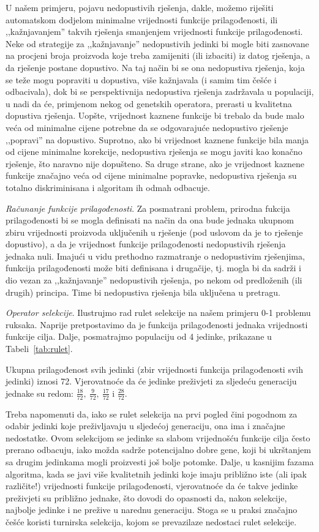 \documentclass[b5paper, utf8, 11pt, colorlinks]{book}
\theoremstyle{definition}
\begin{document}
U našem primjeru, pojavu nedopustivih rješenja, dakle, možemo riješiti automatskom dodjelom minimalne vrijednosti funkcije prilagođenosti, ili ,,kažnjavanjem'' takvih rješenja smanjenjem vrijednosti funkcije prilagođenosti. Neke od strategije za ,,kažnjavanje'' nedopustivih jedinki bi mogle biti zasnovane na procjeni broja proizvoda koje treba zamijeniti (ili izbaciti) iz datog rješenja, a da rješenje postane dopustivo. Na taj način bi se ona nedopustiva rješenja, koja se teže mogu popraviti u dopustiva, više kažnjavala (i samim tim češće i odbacivala), dok bi se perspektivnija nedopustiva rješenja zadržavala u populaciji, u nadi da će, primjenom nekog od genetskih operatora, prerasti u kvalitetna dopustiva rješenja. Uopšte, vrijednost kaznene funkcije bi trebalo da bude malo veća od minimalne cijene potrebne da se odgovarajuće nedopustivo rješenje ,,popravi'' na dopustivo. Suprotno, ako bi vrijednost kaznene funkcije bila manja od cijene minimalne korekcije, nedopustiva rješenja se mogu javiti kao konačno rješenje, što naravno nije dopušteno. Sa druge strane, ako je vrijednost kaznene funkcije značajno veća od cijene minimalne popravke, nedopustiva rješenja su totalno diskriminisana i algoritam ih odmah odbacuje. 

\emph{Računanje funkcije prilagođenosti}. Za posmatrani problem, prirodna fukcija prilagođenosti bi se mogla definisati na način da ona bude jednaka ukupnom zbiru vrijednosti proizvoda uključenih u rješenje (pod uslovom da je to rješenje dopustivo), a da je vrijednost funkcije prilagođenosti  nedopustivih rješenja   jednaka nuli. 
Imajući u vidu prethodno razmatranje o nedopustivim rješenjima, funkcija prilagođenosti može biti definisana i drugačije, tj. mogla bi da sadrži i dio vezan za  ,,kažnjavanje'' nedopustivih rješenja, po nekom od predloženih (ili drugih) principa. Time bi nedopustiva rješenja bila uključena u pretragu.

\emph{Operator selekcije}. Ilustrujmo rad rulet selekcije na našem primjeru 0-1 problemu ruksaka. Naprije pretpostavimo da je funkcija prilagođenosti jednaka vrijednosti funkcije cilja. Dalje, posmatrajmo populaciju od 4 jedinke, prikazane u Tabeli~\ref{tab:rulet}.

Ukupna prilagođenost svih jedinki (zbir vrijednosti funkcija prilagođenosti svih jedinki) iznosi 72. Vjerovatnoće da će jedinke preživjeti za sljedeću generaciju jednake su redom: $\frac{18}{72},\ \frac{9}{72},\ \frac{17}{72}$ i $\frac{28}{72}$. 

Treba napomenuti da, iako se rulet selekcija na prvi pogled čini pogodnom za odabir jedinki koje preživljavaju u sljedećoj generaciju, ona ima i značajne nedostatke. Ovom selekcijom se jedinke sa slabom vrijednošću funkcije cilja često prerano odbacuju, iako možda sadrže potencijalno dobre gene, koji bi ukrštanjem sa drugim jedinkama mogli proizvesti još bolje potomke. Dalje, u kasnijim fazama algoritma, kada se javi više kvalitetnih jedinki koje imaju približno iste (ali ipak različite!) vrijednosti funkcije prilagođenosti, vjerovatnoće da će takve jedinke preživjeti su približno jednake, što dovodi do opasnosti da, nakon selekcije, najbolje jedinke i ne prežive u narednu generaciju. Stoga se u praksi značajno češće koristi turnirska selekcija, kojom se prevazilaze nedostaci rulet selekcije.
\end{document}
